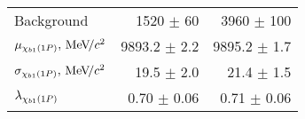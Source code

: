 \begin{table}[H]
{{\begin{tabular}{lrr}
\rule{0pt}{4ex}Background & 1520 $\pm$ 60 & 3960 $\pm$ 100\\

\rule{0pt}{4ex}$\mu_{\chi_{b 1}(1P)}, {\mathrm{\,Me\kern -0.1em V\!/}c^2}$ & 9893.2 $\pm$ 2.2 & 9895.2 $\pm$ 1.7\\
$\sigma_{\chi_{b 1}(1P)}, {\mathrm{\,Me\kern -0.1em V\!/}c^2}$ & 19.5 $\pm$ 2.0 & 21.4 $\pm$ 1.5\\

\rule{0pt}{4ex}$\lambda_{\chi_{b 1}(1P)}$ & 0.70 $\pm$ 0.06 & 0.71 $\pm$ 0.06\\
\bottomrule
\end{tabular}
} %

} %
\label{tab:chib:ups1s:conv_fits}
\end{table}